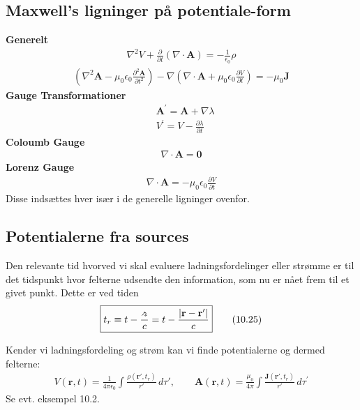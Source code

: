 \documentclass[a4paper]{article}
\begin{document}
    \subsection{Maxwell's ligninger på potentiale-form}
    \textbf{Generelt}
    \begin{align*}
        \boxed{\nabla ^{2} V + \frac{\partial}{\partial t} \left( \nabla \cdot \mathbf{A} \right) = - \frac{1}{\epsilon _0} \rho} \tag{10.4}
    \end{align*} 
    \begin{align*}
       \boxed{ \left( \nabla^2 \mathbf{A} - \mu_0 \epsilon_0 \frac{\partial^2 \mathbf{A}}{\partial t^2} \right)
        - \nabla \left( \nabla \cdot \mathbf{A} + \mu_0 \epsilon_0 \frac{\partial V}{\partial t} \right)
        = -\mu_0 \mathbf{J} }\tag{10.5}
    \end{align*}
    \textbf{Gauge Transformationer}
    \begin{align*}
        &\mathbf{A}^{\prime}  = \mathbf{A} + \nabla \lambda \\
        &V^{\prime}  = V - \frac{\partial \lambda }{\partial t} \tag{10.7}
    \end{align*} 
    \textbf{Coloumb Gauge}
    \begin{align*}
        \nabla \cdot \mathbf{A} = \mathbf{0} \tag{10.8}
    \end{align*} 
    \textbf{Lorenz Gauge}
    \begin{align*}
        \boxed{\nabla \cdot \mathbf{A} = - \mu _0 \epsilon _0 \frac{\partial V}{\partial t} } \tag{10.12}
    \end{align*} 
    Disse indsættes hver især i de generelle ligninger ovenfor.
    \subsection{Potentialerne fra sources}
    Den relevante tid hvorved vi skal evaluere ladningsfordelinger eller strømme er til det tidspunkt hvor felterne udsendte den information, som nu er nået frem til et givet punkt. Dette er ved tiden \begin{align*}
        \boxed{t_r \equiv t - \frac{\griffr[2] }{c} = t - \frac{\left| \mathbf{r} - \mathbf{r}^{\prime}  \right| }{c}} \tag{10.25}
    \end{align*}
    
    Kender vi ladningsfordeling og strøm kan vi finde potentialerne og dermed felterne: 
    \begin{align*}
        \boxed{V(\mathbf{r}, t) = \frac{1}{4 \pi \epsilon_0} \int \frac{\rho(\mathbf{r}', t_r)}{r'} \, d\tau',\qquad
        \mathbf{A}(\mathbf{r}, t) = \frac{\mu_0}{4 \pi} \int \frac{\mathbf{J}(\mathbf{r}', t_r)}{r'} \, d\tau^{\prime} } \tag{10.26}
    \end{align*}
    Se evt. eksempel 10.2.
\end{document}
